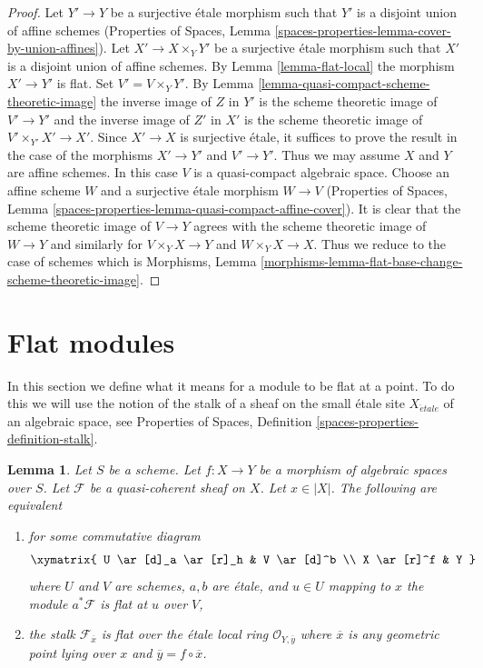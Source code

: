 \documentclass{stacks-project}
\theoremstyle{plain}
\newtheorem{lemma}[subsection]{Lemma}
\theoremstyle{definition}
\theoremstyle{remark}
\numberwithin{equation}{subsection}
\def\etale{{\acute{e}tale}}
\begin{document}
\begin{proof}
Let $Y' \to Y$ be a surjective \'etale morphism such that $Y'$ is a
disjoint union of affine schemes (Properties of Spaces,
Lemma \ref{spaces-properties-lemma-cover-by-union-affines}).
Let $X' \to X \times_Y Y'$ be a surjective \'etale morphism such
that $X'$ is a disjoint union of affine schemes.
By Lemma \ref{lemma-flat-local} the morphism $X' \to Y'$ is flat.
Set $V' = V \times_Y Y'$.
By Lemma \ref{lemma-quasi-compact-scheme-theoretic-image}
the inverse image of $Z$ in $Y'$ is the scheme theoretic
image of $V' \to Y'$ and the inverse image of $Z'$ in $X'$
is the scheme theoretic image of $V' \times_{Y'} X' \to X'$.
Since $X' \to X$ is surjective \'etale, it suffices to prove
the result in the case of the morphisms $X' \to Y'$ and $V' \to Y'$.
Thus we may assume $X$ and $Y$ are affine schemes.
In this case $V$ is a quasi-compact algebraic space.
Choose an affine scheme $W$ and a surjective \'etale morphism
$W \to V$ (Properties of Spaces, Lemma
\ref{spaces-properties-lemma-quasi-compact-affine-cover}).
It is clear that the scheme theoretic image of $V \to Y$
agrees with the scheme theoretic image of $W \to Y$ and
similarly for $V \times_Y X \to Y$ and $W \times_Y X \to X$.
Thus we reduce to the case of schemes which is
Morphisms, Lemma
\ref{morphisms-lemma-flat-base-change-scheme-theoretic-image}.
\end{proof}





\section{Flat modules}
\label{section-flat-modules}

\noindent
In this section we define what it means for a module to be flat at
a point. To do this we will use the notion of the stalk of a sheaf on
the small \'etale site $X_\etale$ of an algebraic space, see
Properties of Spaces, Definition \ref{spaces-properties-definition-stalk}.

\begin{lemma}
\label{lemma-flat-at-point}
Let $S$ be a scheme. Let $f : X \to Y$ be a morphism of algebraic
spaces over $S$. Let $\mathcal{F}$ be a quasi-coherent sheaf on $X$.
Let $x \in |X|$. The following are equivalent
\begin{enumerate}
\item for some commutative diagram
$$
\xymatrix{
U \ar[d]_a \ar[r]_h & V \ar[d]^b \\
X \ar[r]^f & Y
}
$$
where $U$ and $V$ are schemes, $a, b$ are \'etale, and
$u \in U$ mapping to $x$ the module $a^*\mathcal{F}$ is flat at $u$ over $V$,
\item the stalk $\mathcal{F}_{\overline{x}}$ is flat over
the \'etale local ring $\mathcal{O}_{Y, \overline{y}}$
where $\overline{x}$ is any geometric point lying over
$x$ and $\overline{y} = f \circ \overline{x}$.
\end{enumerate}
\end{lemma}
\end{document}

